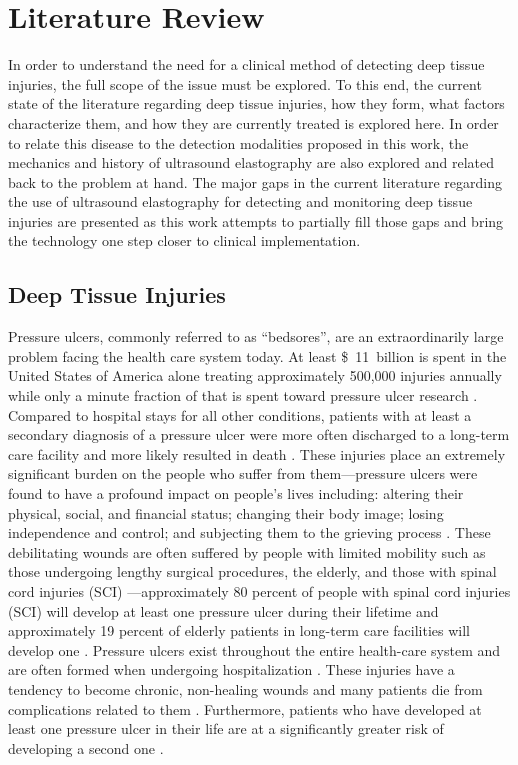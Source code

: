 \chapter{Literature Review}
\label{chap:litreview}
	In order to understand the need for a clinical method of detecting deep tissue injuries, the full scope of the issue must be explored. To this end, the current state of the literature regarding deep tissue injuries, how they form, what factors characterize them, and how they are currently treated is explored here. In order to relate this disease to the detection modalities proposed in this work, the mechanics and history of ultrasound elastography are also explored and related back to the problem at hand. The major gaps in the current literature regarding the use of ultrasound elastography for detecting and monitoring deep tissue injuries are presented as this work attempts to partially fill those gaps and bring the technology one step closer to clinical implementation.

	\section{Deep Tissue Injuries}
		Pressure ulcers, commonly referred to as ``bedsores'', are an extraordinarily large problem facing the health care system today. At least \SI{11}[\$]{billion} is spent in the United States of America alone treating approximately 500,000 injuries annually \cite{beckrich99,russo08} while only a minute fraction of that is spent toward pressure ulcer research \cite{zanca03}. Compared to hospital stays for all other conditions, patients with at least a secondary diagnosis of a pressure ulcer were more often discharged to a long-term care facility and more likely resulted in death \cite{russo08}. These injuries place an extremely significant burden on the people who suffer from them---pressure ulcers were found to have a profound impact on people's lives including: altering their physical, social, and financial status; changing their body image; losing independence and control; and subjecting them to the grieving process \cite{langemo00,baharestani94}. These debilitating wounds are often suffered by people with limited mobility such as those undergoing lengthy surgical procedures, the elderly, and those with spinal cord injuries (SCI) \cite{allman95}---approximately 80 percent of people with spinal cord injuries (SCI) will develop at least one pressure ulcer during their lifetime \cite{salzberg96} and approximately 19 percent of elderly patients in long-term care facilities will develop one \cite{freitas11}. Pressure ulcers exist throughout the entire health-care system and are often formed when undergoing hospitalization \cite{aronovitch99}. These injuries have a tendency to become chronic, non-healing wounds and many patients die from complications related to them \cite{jaul10}. Furthermore, patients who have developed at least one pressure ulcer in their life are at a significantly greater risk of developing a second one \cite{niazi97}. 

